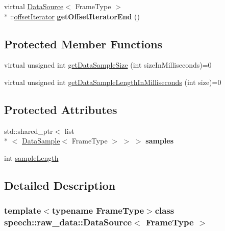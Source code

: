 \begin{DoxyCompactItemize}
\item 
\hypertarget{classspeech_1_1raw__data_1_1DataSource_a7dd82ecfd29d317f25f6bf4a032d49b9}{virtual \hyperlink{classspeech_1_1raw__data_1_1DataSource}{Data\+Source}$<$ Frame\+Type $>$\\*
\+::\hyperlink{classspeech_1_1raw__data_1_1DataSource_1_1offsetIterator}{offset\+Iterator} {\bfseries get\+Offset\+Iterator\+End} ()}\label{classspeech_1_1raw__data_1_1DataSource_a7dd82ecfd29d317f25f6bf4a032d49b9}

\end{DoxyCompactItemize}
\subsection*{Protected Member Functions}
\begin{DoxyCompactItemize}
\item 
virtual unsigned int \hyperlink{classspeech_1_1raw__data_1_1DataSource_ab4d9cfbe2d556e6d587e25e4b3074d5f}{get\+Data\+Sample\+Size} (int size\+In\+Milliseconds)=0
\item 
virtual unsigned int \hyperlink{classspeech_1_1raw__data_1_1DataSource_aa4157ef95d70d9c1babd2e9ead0d573a}{get\+Data\+Sample\+Length\+In\+Milliseconds} (int size)=0
\end{DoxyCompactItemize}
\subsection*{Protected Attributes}
\begin{DoxyCompactItemize}
\item 
\hypertarget{classspeech_1_1raw__data_1_1DataSource_a726a703fbc183408d8d1c3e21c3e042c}{std\+::shared\+\_\+ptr$<$ list\\*
$<$ \hyperlink{classspeech_1_1raw__data_1_1DataSample}{Data\+Sample}$<$ Frame\+Type $>$ $>$ $>$ {\bfseries samples}}\label{classspeech_1_1raw__data_1_1DataSource_a726a703fbc183408d8d1c3e21c3e042c}

\item 
int \hyperlink{classspeech_1_1raw__data_1_1DataSource_a6041f72109ebba9e84e49d71f626b8ea}{sample\+Length}
\end{DoxyCompactItemize}


\subsection{Detailed Description}
\subsubsection*{template$<$typename Frame\+Type$>$class speech\+::raw\+\_\+data\+::\+Data\+Source$<$ Frame\+Type $>$}


